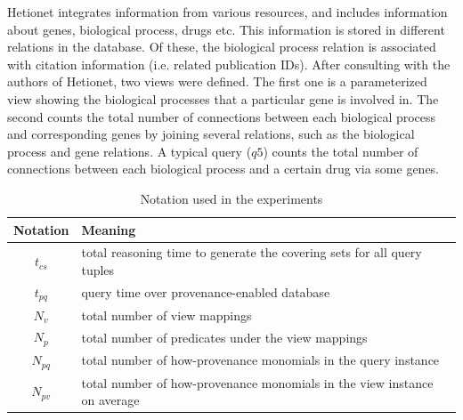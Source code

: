 Hetionet integrates information from various resources, and includes information about genes, biological process, drugs etc.  This information is stored in different relations in the database. Of these, the biological process relation is associated with citation information (i.e. related publication IDs). After consulting with the authors of Hetionet, two views were defined. The first one is a parameterized view showing the  biological processes that a particular gene is involved in. The second counts the total number of connections between each biological process and corresponding genes by joining several relations, such as the biological process and gene relations.  A typical query ($q5$) counts the total number of connections between each biological process and a certain drug via some genes.


\begin{table}
\centering
\caption{Notation used in the experiments}
\small
\begin{tabular}[!h]{|c|>{\centering\arraybackslash}p{6.8cm}|} \hline
Notation & Meaning \\ \hline
$t_{cs}$&total reasoning time to generate the covering sets for all query tuples \\ \hline
$t_{pq}$&query time over provenance-enabled database \\ \hline
$N_v$&total number of view mappings \\ \hline
$N_p$&total number of predicates under the view mappings \\ \hline
$N_{pq}$&total number of how-provenance monomials in the query instance \\ \hline
$N_{pv}$&total number of how-provenance monomials in the view instance on average\\ \hline
\end{tabular}
\label{Table: notation_summary}
\end{table}

